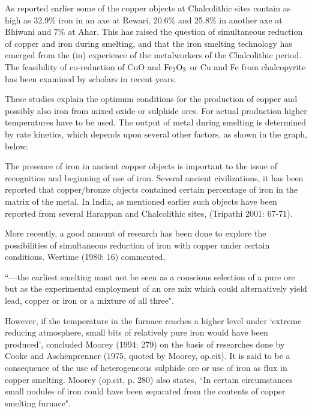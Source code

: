 As reported earlier some of the copper objects at Chalcolithic sites contain as high as 32.9\% iron in an axe at Rewari, 20.6\% and 25.8\% in another axe at Bhiwani and 7\% at Ahar. This has raised the question of simultaneous reduction of copper and iron during smelting, and that the iron smelting technology has emerged from the (in) experience of the metalworkers of the Chalcolithic period. The feasibility of co-reduction of CuO and ${\rm Fe}_{2}{\rm O}_{3}$ or Cu and Fe from chalcopyrite has been examined by scholars in recent years.

These studies explain the optimum conditions for the production of copper and possibly also iron from mixed oxide or sulphide ores. For actual production higher temperatures have to be used. The output of metal during smelting is determined by rate kinetics, which depends upon several other factors, as shown in the graph, below:

The presence of iron in ancient copper objects is important to the issue of recognition and beginning of use of iron. Several ancient civilizations, it has been reported that copper/bronze objects contained certain percentage of iron in the matrix of the metal. In India, as mentioned earlier such objects have been reported from several Harappan and Chalcolithic sites, (Tripathi 2001: 67-71).

More recently, a good amount of research has been done to explore the possibilities of simultaneous reduction of iron with copper under certain conditions. Wertime (1980: 16) commented,

{\footnotesize ``---the earliest smelting must not be seen as a conscious selection of a pure ore but as the experimental employment of an ore mix which could alternatively yield lead, copper or iron or a mixture of all three".}

However, if the temperature in the furnace reaches a higher level under `extreme reducing atmosphere, small bits of relatively pure iron would have been produced', concluded Moorey (1994: 279) on the basis of researches done by Cooke and Aschenprenner (1975, quoted by Moorey, op.cit). It is said to be a consequence of the use of heterogeneous sulphide ore or use of iron as flux in copper smelting. Moorey (op.cit, p. 280) also states, ``In certain circumstances small nodules of iron could have been separated from the contents of copper smelting furnace".

